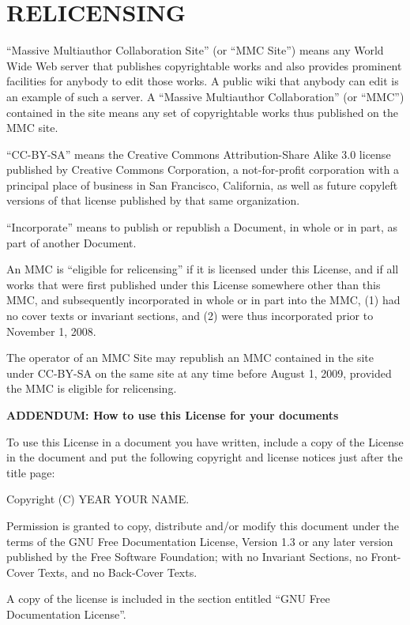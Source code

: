 \section{RELICENSING}

“Massive Multiauthor Collaboration Site” (or “MMC
Site”) means any World Wide Web server that publishes
copyrightable works and also provides prominent facilities for
anybody to edit those works. A public wiki that anybody can
edit is an example of such a server. A “Massive Multiauthor
Collaboration” (or “MMC”) contained in the site means
any set of copyrightable works thus published on the MMC site.

“CC-BY-SA” means the Creative Commons Attribution-Share
Alike 3.0 license published by Creative Commons Corporation, a
not-for-profit corporation with a principal place of business
in San Francisco, California, as well as future copyleft
versions of that license published by that same organization.

“Incorporate” means to publish or republish a Document,
in whole or in part, as part of another Document.

An MMC is “eligible for relicensing” if it is licensed
under this License, and if all works that were first
published under this License somewhere other than this MMC,
and subsequently incorporated in whole or in part into the
MMC, (1) had no cover texts or invariant sections, and (2)
were thus incorporated prior to November 1, 2008.

The operator of an MMC Site may republish an MMC contained in
the site under CC-BY-SA on the same site at any time before
August 1, 2009, provided the MMC is eligible for relicensing.


\textbf{ADDENDUM: How to use this License for your documents}

To use this License in a document you have written, include
a copy of the License in the document and put the following
copyright and license notices just after the title page:

\begin{myindentpara}{2cm}
Copyright (C)  YEAR  YOUR NAME.

Permission is granted to copy, distribute and/or modify this document
under the terms of the GNU Free Documentation License, Version 1.3
or any later version published by the Free Software Foundation;
with no Invariant Sections, no Front-Cover Texts, and no Back-Cover
Texts.  

A copy of the license is included in the section entitled ``GNU
Free Documentation License''.
\end{myindentpara}

